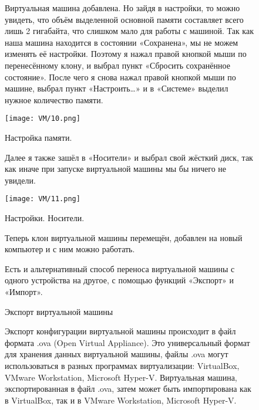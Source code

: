 \begin{figure}
\quad Виртуальная машина добавлена. Но зайдя в настройки, то можно увидеть, что объём выделенной основной памяти составляет всего лишь 2 гигабайта, что слишком мало для работы с машиной. Так как наша машина находится в состоянии «Сохранена», мы не можем изменять её настройки. Поэтому я нажал правой кнопкой мыши по перенесённому клону, и выбрал пункт «Сбросить сохранённое состояние». После чего я снова нажал правой кнопкой мыши по машине, выбрал пункт «Настроить…» и в «Системе» выделил нужное количество памяти.

		\centering
		\texttt{[image: VM/10.png]}
\caption{Настройка памяти.}
\label{ris:image}
\end{figure}

\begin{figure}
\quad Далее я также зашёл в «Носители» и выбрал свой жёсткий диск, так как иначе при запуске виртуальной машины мы бы ничего не увидели.

		\centering
		\texttt{[image: VM/11.png]}
\caption{Настройки. Носители.}
\label{ris:image}

\end{figure}

\begin{figure}
\quad Теперь клон виртуальной машины перемещён, добавлен на новый компьютер и с ним можно работать.
\end{figure}

\begin{figure}
\quad Есть и альтернативный способ переноса виртуальной машины с одного устройства на другое, с помощью функций «Экспорт» и «Импорт».
\end{figure}

\begin{figure}
\centering
Экспорт виртуальной машины
\label{ris:image}
\end{figure}

\begin{figure}
\quad Экспорт конфигурации виртуальной машины происходит в файл формата .ova (Open Virtual Appliance). Это универсальный формат для хранения данных виртуальной машины, файлы .ova могут использоваться в разных программах виртуализации: VirtualBox, VMware Workstation, Microsoft Hyper-V. Виртуальная машина, экспортированная в файл .ova, затем может быть импортирована как в VirtualBox, так и в VMware Workstation, Microsoft Hyper-V.
\end{figure}

